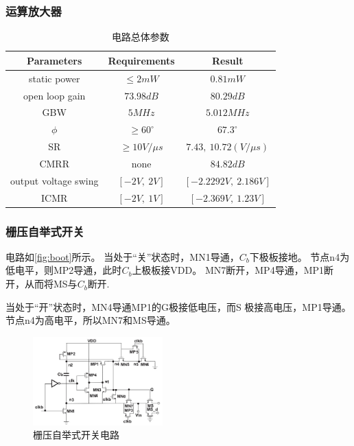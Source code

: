 \documentclass[10pt, mathserif]{beamer}	%
\newcommand{\ftitle}[1]{\frametitle{#1}}	%
\begin{document}
	\begin{frame}
		\ftitle{运算放大器}
		\begin{table}[H]
			\centering
			\begin{tabular}{|c|c|c|}
			\hline
			Parameters & Requirements & Result \\ \hline
			static power & $ \leq 2mW  $ & $ 0.81mW $ \\ \hline
			open loop gain & $ 73.98dB $ & $ 80.29dB $ \\ \hline
			GBW & $ 5MHz $ & $ 5.012MHz $ \\ \hline
			$\phi$ & $ \geq 60^\circ $ & $ 67.3^\circ $ \\ \hline
			SR & $ \geq 10V/\mu s $ & $ 7.43,\ 10.72(V/\mu s) $ \\ \hline
			CMRR & none & $ 84.82dB $ \\ \hline
			output voltage swing & $ [-2V,\ 2V] $ & $ [-2.2292V,\ 2.186V] $ \\ \hline
			ICMR & $ [-2V,\ 1V] $ & $ [-2.369V,\ 1.23V] $ \\ \hline
			\end{tabular}
			\caption{\label{tab:all}电路总体参数}	

				
		\end{table} 
	\end{frame}

	\begin{frame}
		\ftitle{栅压自举式开关}
		电路如\autoref{fig:boot}所示。
		当处于“关”状态时，MN1导通，$ C_b $下极板接地。
		节点n4为低电平，则MP2导通，此时$ C_b $上极板接VDD。
		MN7断开，MP4导通，MP1断开，从而将MS与$ C_b $断开.
		\par 当处于“开”状态时，MN4导通MP1的G极接低电压，而S
		极接高电压，MP1导通。节点n4为高电平，所以MN7和MS导通。
		\begin{figure}[ht]
			\includegraphics[width=5cm]{boot}
			\caption{\label{fig:boot}栅压自举式开关电路}
		\end{figure}		
	\end{frame}
\end{document}
